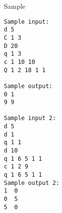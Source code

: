 Sample
\begin{verbatim}
Sample input: 
d 5 
C 1 3 
D 20 
q 1 3 
c 1 10 10 
Q 1 2 18 1 1 

Sample output: 
0 1 
9 9  

Sample input 2:
d 5
d 1
q 1 1
d 10
q 1 6 5 1 1
c 1 2 9
q 1 6 5 1 1
Sample output 2:
1  0
0  5
5  0
\end{verbatim}

 

 

 